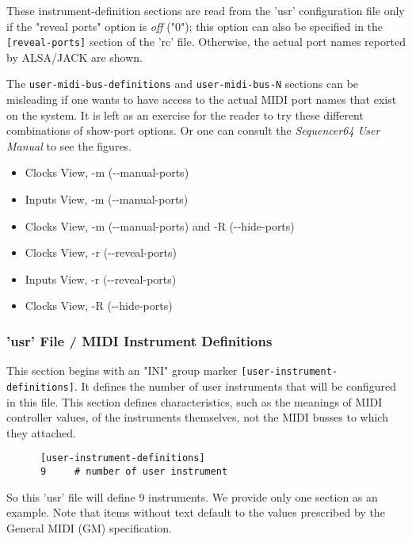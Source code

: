    These instrument-definition
   sections are read from the 'usr' configuration file only if
   the "reveal ports" option is \textsl{off} ("0");
   this option can also be specified in the
   \texttt{[reveal-ports]} section of the 'rc' file.
   Otherwise, the actual port names reported by ALSA/JACK are shown.

   The \texttt{user-midi-bus-definitions} and \texttt{user-midi-bus-N} sections
   can be misleading if one wants to have access to the
   actual MIDI port names that exist on the system.
   It is left as an exercise for the reader to try these different combinations
   of show-port options.  Or one can consult the \textsl{Sequencer64 User
   Manual} to see the figures.

   \begin{itemize}
      \item Clocks View, -m (-{}-manual-ports)
      \item Inputs View, -m (-{}-manual-ports)
      \item Clocks View, -m (-{}-manual-ports) and -R (-{}-hide-ports)
      \item Clocks View, -r (-{}-reveal-ports)
      \item Inputs View, -r (-{}-reveal-ports)
      \item Clocks View, -R (-{}-hide-ports)
   \end{itemize}

\subsubsection{'usr' File / MIDI Instrument Definitions}
\label{subsubsec:usr_file_midi_instrument_definitions}

   This section begins with an
   "INI" group marker \texttt{[user-instrument-definitions]}.
   It defines the number of user instruments that will be configured in this
   file.  This section defines characteristics, such as
   the meanings of MIDI controller values, of the instruments themselves,
   not the MIDI busses to which they attached.

   \begin{verbatim}
      [user-instrument-definitions]
      9     # number of user instrument
   \end{verbatim}

   So this 'usr' file will define 9 instruments.  We provide only one section
   as an example.  Note that items without text default to the values
   prescribed by the General MIDI (GM) specification.

